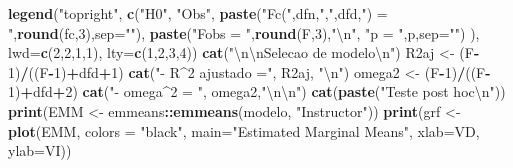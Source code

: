 \documentclass[]{article}
\newenvironment{Shaded}{\begin{snugshade}}{\end{snugshade}}
\newcommand{\KeywordTok}[1]{\textcolor[rgb]{0.13,0.29,0.53}{\textbf{#1}}}
\newcommand{\DataTypeTok}[1]{\textcolor[rgb]{0.13,0.29,0.53}{#1}}
\newcommand{\DecValTok}[1]{\textcolor[rgb]{0.00,0.00,0.81}{#1}}
\newcommand{\CharTok}[1]{\textcolor[rgb]{0.31,0.60,0.02}{#1}}
\newcommand{\StringTok}[1]{\textcolor[rgb]{0.31,0.60,0.02}{#1}}
\newcommand{\OperatorTok}[1]{\textcolor[rgb]{0.81,0.36,0.00}{\textbf{#1}}}
\newcommand{\NormalTok}[1]{#1}
\begin{document}
\begin{Shaded}
\begin{Highlighting}[]
{{{\KeywordTok{legend}\NormalTok{(}\StringTok{"topright"}\NormalTok{,}
       \KeywordTok{c}\NormalTok{(}\StringTok{"H0"}\NormalTok{, }\StringTok{"Obs"}\NormalTok{, }
         \KeywordTok{paste}\NormalTok{(}\StringTok{"Fc("}\NormalTok{,dfn,}\StringTok{","}\NormalTok{,dfd,}\StringTok{") = "}\NormalTok{,}\KeywordTok{round}\NormalTok{(fc,}\DecValTok{3}\NormalTok{),}\DataTypeTok{sep=}\StringTok{""}\NormalTok{), }
         \KeywordTok{paste}\NormalTok{(}\StringTok{"Fobs = "}\NormalTok{,}\KeywordTok{round}\NormalTok{(F,}\DecValTok{3}\NormalTok{),}\StringTok{"}\CharTok{\textbackslash{}n}\StringTok{"}\NormalTok{,}
               \StringTok{"p = "}\NormalTok{,p,}\DataTypeTok{sep=}\StringTok{""}\NormalTok{) }
\NormalTok{         ), }
       \DataTypeTok{lwd=}\KeywordTok{c}\NormalTok{(}\DecValTok{2}\NormalTok{,}\DecValTok{2}\NormalTok{,}\DecValTok{1}\NormalTok{,}\DecValTok{1}\NormalTok{), }\DataTypeTok{lty=}\KeywordTok{c}\NormalTok{(}\DecValTok{1}\NormalTok{,}\DecValTok{2}\NormalTok{,}\DecValTok{3}\NormalTok{,}\DecValTok{4}\NormalTok{))}
\KeywordTok{cat}\NormalTok{(}\StringTok{"}\CharTok{\textbackslash{}n\textbackslash{}n}\StringTok{Selecao de modelo}\CharTok{\textbackslash{}n}\StringTok{"}\NormalTok{)}
\NormalTok{R2aj <-}\StringTok{ }\NormalTok{(F}\OperatorTok{-}\DecValTok{1}\NormalTok{)}\OperatorTok{/}\NormalTok{((F}\OperatorTok{-}\DecValTok{1}\NormalTok{)}\OperatorTok{+}\NormalTok{dfd}\OperatorTok{+}\DecValTok{1}\NormalTok{)}
\KeywordTok{cat}\NormalTok{(}\StringTok{"- R^2 ajustado ="}\NormalTok{, R2aj, }\StringTok{"}\CharTok{\textbackslash{}n}\StringTok{"}\NormalTok{)}
\NormalTok{omega2 <-}\StringTok{ }\NormalTok{(F}\OperatorTok{-}\DecValTok{1}\NormalTok{)}\OperatorTok{/}\NormalTok{((F}\OperatorTok{-}\DecValTok{1}\NormalTok{)}\OperatorTok{+}\NormalTok{dfd}\OperatorTok{+}\DecValTok{2}\NormalTok{)}
\KeywordTok{cat}\NormalTok{(}\StringTok{"- omega^2 = "}\NormalTok{, omega2,}\StringTok{"}\CharTok{\textbackslash{}n\textbackslash{}n}\StringTok{"}\NormalTok{)}
\KeywordTok{cat}\NormalTok{(}\KeywordTok{paste}\NormalTok{(}\StringTok{"Teste post hoc}\CharTok{\textbackslash{}n}\StringTok{"}\NormalTok{))}
\KeywordTok{print}\NormalTok{(EMM <-}\StringTok{ }\NormalTok{emmeans}\OperatorTok{::}\KeywordTok{emmeans}\NormalTok{(modelo, }\StringTok{"Instructor"}\NormalTok{))}
\KeywordTok{print}\NormalTok{(grf <-}\StringTok{ }\KeywordTok{plot}\NormalTok{(EMM, }\DataTypeTok{colors =} \StringTok{"black"}\NormalTok{,}
                  \DataTypeTok{main=}\StringTok{"Estimated Marginal Means"}\NormalTok{,}
                  \DataTypeTok{xlab=}\NormalTok{VD,}
                  \DataTypeTok{ylab=}\NormalTok{VI))}

}}}
\end{Highlighting}
\end{Shaded}
\end{document}
